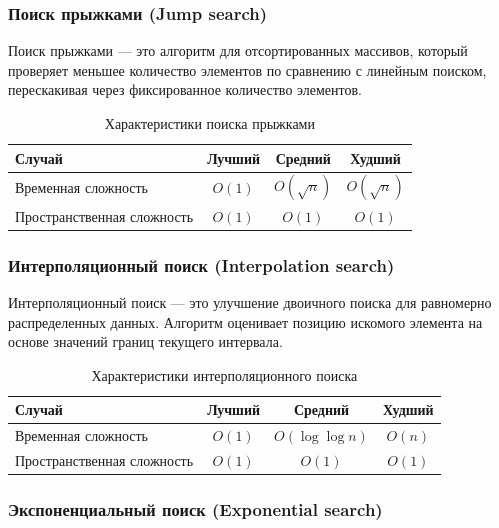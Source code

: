 \documentclass[a4paper,12pt]{article}
\begin{document}
\subsubsection{Поиск прыжками (Jump search)}
\label{subsubsec:поиск-прыжками-jump-search}

Поиск прыжками --- это алгоритм для отсортированных массивов, который проверяет меньшее количество элементов по сравнению с линейным поиском, перескакивая через фиксированное количество элементов.

\begin{table}[H]
    \centering
    \begin{tabular}{|l|c|c|c|}
        \hline
        Случай & Лучший & Средний & Худший \\
        \hline
        Временная сложность & $O(1)$ & $O(\sqrt{n})$ & $O(\sqrt{n})$ \\
        \hline
        Пространственная сложность & $O(1)$ & $O(1)$ & $O(1)$ \\
        \hline
    \end{tabular}
    \caption{Характеристики поиска прыжками}
\end{table}

\subsubsection{Интерполяционный поиск (Interpolation search)}
\label{subsubsec:интерполяционный-поиск-interpolation-search}

Интерполяционный поиск --- это улучшение двоичного поиска для равномерно распределенных данных. Алгоритм оценивает позицию искомого элемента на основе значений границ текущего интервала.

\begin{table}[H]
    \centering
    \begin{tabular}{|l|c|c|c|}
        \hline
        Случай & Лучший & Средний & Худший \\
        \hline
        Временная сложность & $O(1)$ & $O(\log \log n)$ & $O(n)$ \\
        \hline
        Пространственная сложность & $O(1)$ & $O(1)$ & $O(1)$ \\
        \hline
    \end{tabular}
    \caption{Характеристики интерполяционного поиска}
\end{table}

\subsubsection{Экспоненциальный поиск (Exponential search)}
\label{subsubsec:экспоненциальный-поиск-exponential-search}
\end{document}
